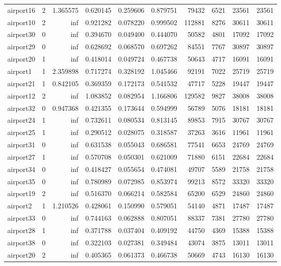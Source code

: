 \begin{longtable}{|l|r|r|r|r|r|r|r|r|r|}
airport16 & 2 & 1.365575 & 0.620145 & 0.259606 & 0.879751 & 79432 & 6521 & 23561 & 23561 \\
airport10 & 2 & inf & 0.921282 & 0.078220 & 0.999502 & 112881 & 8276 & 30611 & 30611 \\
airport30 & 0 & inf & 0.394670 & 0.049400 & 0.444070 & 50582 & 4801 & 17092 & 17092 \\
airport29 & 0 & inf & 0.628692 & 0.068570 & 0.697262 & 84551 & 7767 & 30897 & 30897 \\
airport20 & 1 & inf & 0.418014 & 0.049724 & 0.467738 & 50643 & 4717 & 16091 & 16091 \\
airport1 & 1 & 2.359898 & 0.717274 & 0.328192 & 1.045466 & 92191 & 7022 & 25719 & 25719 \\
airport21 & 1 & 0.842105 & 0.369359 & 0.172173 & 0.541532 & 47717 & 5228 & 19447 & 19447 \\
airport12 & 2 & inf & 1.083852 & 0.082954 & 1.166806 & 129582 & 9827 & 38008 & 38008 \\
airport32 & 0 & 0.947368 & 0.421355 & 0.173644 & 0.594999 & 56789 & 5076 & 18181 & 18181 \\
airport24 & 1 & inf & 0.732611 & 0.080534 & 0.813145 & 89853 & 7915 & 30767 & 30767 \\
airport25 & 1 & inf & 0.290512 & 0.028075 & 0.318587 & 37263 & 3616 & 11961 & 11961 \\
airport31 & 0 & inf & 0.631538 & 0.055043 & 0.686581 & 77541 & 6653 & 24769 & 24769 \\
airport27 & 1 & inf & 0.570708 & 0.050301 & 0.621009 & 71880 & 6151 & 22684 & 22684 \\
airport34 & 0 & inf & 0.418427 & 0.055654 & 0.474081 & 49707 & 5589 & 21758 & 21758 \\
airport35 & 0 & inf & 0.780989 & 0.072985 & 0.853974 & 99213 & 8572 & 33320 & 33320 \\
airport19 & 2 & inf & 0.516370 & 0.066214 & 0.582584 & 65200 & 6529 & 24860 & 24860 \\
airport2 & 1 & 1.210526 & 0.428061 & 0.150990 & 0.579051 & 54140 & 4871 & 17487 & 17487 \\
airport33 & 0 & inf & 0.744163 & 0.062888 & 0.807051 & 88337 & 7381 & 27780 & 27780 \\
airport28 & 1 & inf & 0.371788 & 0.037404 & 0.409192 & 44750 & 4369 & 15388 & 15388 \\
airport38 & 0 & inf & 0.322103 & 0.027381 & 0.349484 & 43074 & 3875 & 13011 & 13011 \\
airport20 & 2 & inf & 0.405365 & 0.061373 & 0.466738 & 50669 & 4743 & 16130 & 16130 \\

\end{longtable}

